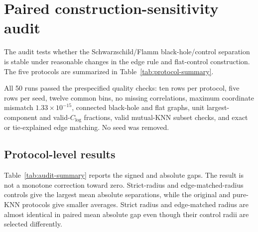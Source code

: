 \documentclass[11pt]{article}
\newcommand{\clog}{C_{\log}}
\begin{document}
\section{Paired construction-sensitivity audit}
\label{sec:construction-audit}

The audit tests whether the Schwarzschild/Flamm black-hole/control separation is
stable under reasonable changes in the edge rule and flat-control construction.
The five protocols are summarized in Table~\ref{tab:protocol-summary}.

\begin{table}[H]
\centering
\caption{Graph-construction and matched-control protocols used in the paired
ten-seed audit.}
\label{tab:protocol-summary}
\small
\setlength{\tabcolsep}{4pt}
\end{table}

All 50 runs passed the prespecified quality checks: ten rows per protocol,
five rows per seed, twelve common bins, no missing correlations, maximum
coordinate mismatch $1.33\times10^{-15}$, connected black-hole and flat graphs,
unit largest-component and valid-$\clog$ fractions, valid mutual-KNN subset
checks, and exact or tie-explained edge matching. No seed was removed.

\subsection{Protocol-level results}

Table~\ref{tab:audit-summary} reports the signed and absolute gaps. The result
is not a monotone correction toward zero. Strict-radius and edge-matched-radius
controls give the largest mean absolute separations, while the original and
pure-KNN protocols give smaller averages. Strict radius and edge-matched radius
are almost identical in paired mean absolute gap even though their control
radii are selected differently.
\end{document}
